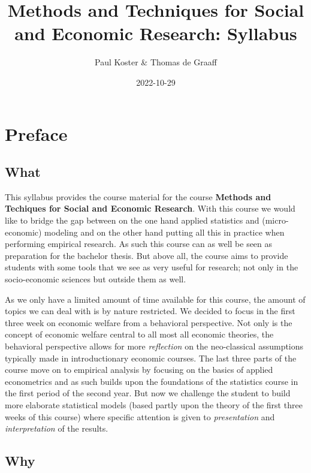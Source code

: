 \documentclass[
]{book}
\title{Methods and Techniques for Social and Economic Research: Syllabus}
\author{Paul Koster \& Thomas de Graaff}
\date{2022-10-29}
\begin{document}
\maketitle

{
\setcounter{tocdepth}{1}
\tableofcontents
}
\hypertarget{preface}{%
\chapter*{Preface}\label{preface}}

\hypertarget{what}{%
\section*{What}\label{what}}

This syllabus provides the course material for the course \textbf{Methods and Techiques for Social and Economic Research}. With this course we would like to bridge the gap between on the one hand applied statistics and (micro-economic) modeling and on the other hand putting all this in practice when performing empirical research. As such this course can as well be seen as preparation for the bachelor thesis. But above all, the course aims to provide students with some tools that we see as very useful for research; not only in the socio-economic sciences but outside them as well.

As we only have a limited amount of time available for this course, the amount of topics we can deal with is by nature restricted. We decided to focus in the first three week on economic welfare from a behavioral perspective. Not only is the concept of economic welfare central to all most all economic theories, the behavioral perspective allows for more \emph{reflection} on the neo-classical assumptions typically made in introductionary economic courses. The last three parts of the course move on to empirical analysis by focusing on the basics of applied econometrics and as such builds upon the foundations of the statistics course in the first period of the second year. But now we challenge the student to build more elaborate statistical models (based partly upon the theory of the first three weeks of this course) where specific attention is given to \emph{presentation} and \emph{interpretation} of the results.

\hypertarget{why}{%
\section*{Why}\label{why}}
\end{document}
